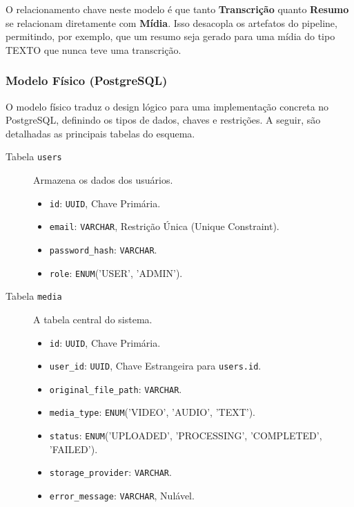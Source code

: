 O relacionamento chave neste modelo é que tanto \textbf{Transcrição} quanto \textbf{Resumo} se relacionam diretamente com \textbf{Mídia}. Isso desacopla os artefatos do pipeline, permitindo, por exemplo, que um resumo seja gerado para uma mídia do tipo TEXTO que nunca teve uma transcrição.

\subsubsection{Modelo Físico (PostgreSQL)}

O modelo físico traduz o design lógico para uma implementação concreta no PostgreSQL, definindo os tipos de dados, chaves e restrições. A seguir, são detalhadas as principais tabelas do esquema.

\begin{description}
    \item[Tabela \texttt{users}] Armazena os dados dos usuários.
        \begin{itemize}
            \item \texttt{id}: \texttt{UUID}, Chave Primária.
            \item \texttt{email}: \texttt{VARCHAR}, Restrição Única (Unique Constraint).
            \item \texttt{password\_hash}: \texttt{VARCHAR}.
            \item \texttt{role}: \texttt{ENUM}('USER', 'ADMIN').
        \end{itemize}

    \item[Tabela \texttt{media}] A tabela central do sistema.
        \begin{itemize}
            \item \texttt{id}: \texttt{UUID}, Chave Primária.
            \item \texttt{user\_id}: \texttt{UUID}, Chave Estrangeira para \texttt{users.id}.
            \item \texttt{original\_file\_path}: \texttt{VARCHAR}.
            \item \texttt{media\_type}: \texttt{ENUM}('VIDEO', 'AUDIO', 'TEXT').
            \item \texttt{status}: \texttt{ENUM}('UPLOADED', 'PROCESSING', 'COMPLETED', 'FAILED').
            \item \texttt{storage\_provider}: \texttt{VARCHAR}.
            \item \texttt{error\_message}: \texttt{VARCHAR}, Nulável.
        \end{itemize}


\end{description}

